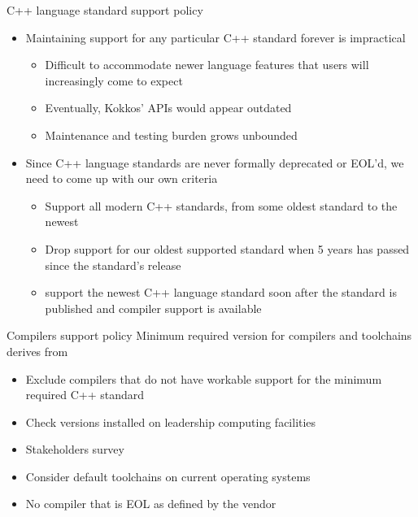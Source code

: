 \begin{frame}[fragile]{C++ language standard support policy}
\begin{itemize}
\item Maintaining support for any particular C++ standard forever is impractical
  \begin{itemize}
  \item Difficult to accommodate newer language features that users will increasingly come to expect
  \item Eventually, Kokkos' APIs would appear outdated
  \item Maintenance and testing burden grows unbounded
  \end{itemize}
\item Since C++ language standards are never formally deprecated or EOL'd, we need to come up with our own criteria
  \begin{itemize}
  \item Support all modern C++ standards, from some oldest standard to the newest
  \item Drop support for our oldest supported standard when 5 years has passed since the standard's release
  \item support the newest C++ language standard soon after the standard is published and compiler support is available
  \end{itemize}
\end{itemize}

\end{frame}

\begin{frame}[fragile]{Compilers support policy}
Minimum required version for compilers and toolchains derives from
\begin{itemize}
\item Exclude compilers that do not have workable support for the minimum required C++ standard
\item Check versions installed on leadership computing facilities
\item Stakeholders survey
\item Consider default toolchains on current operating systems
\item No compiler that is EOL as defined by the vendor
\end{itemize}
\end{frame}


